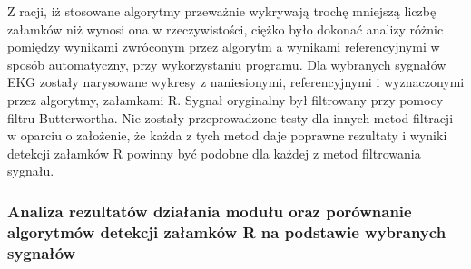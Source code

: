 Z racji, iż stosowane algorytmy przeważnie wykrywają trochę mniejszą liczbę załamków niż wynosi ona w rzeczywistości, ciężko było dokonać analizy różnic pomiędzy wynikami zwróconym przez algorytm a wynikami referencyjnymi w sposób automatyczny, przy wykorzystaniu programu. Dla wybranych sygnałów EKG zostały narysowane wykresy z naniesionymi, referencyjnymi i wyznaczonymi przez algorytmy, załamkami R. Sygnał oryginalny był filtrowany przy pomocy filtru Butterwortha. Nie zostały przeprowadzone testy dla innych metod filtracji w oparciu o założenie, że każda z tych metod daje poprawne rezultaty i wyniki detekcji załamków R powinny być podobne dla każdej z metod filtrowania sygnału.
\subsubsection{Analiza rezultatów działania modułu oraz porównanie algorytmów detekcji załamków R na podstawie wybranych sygnałów}
